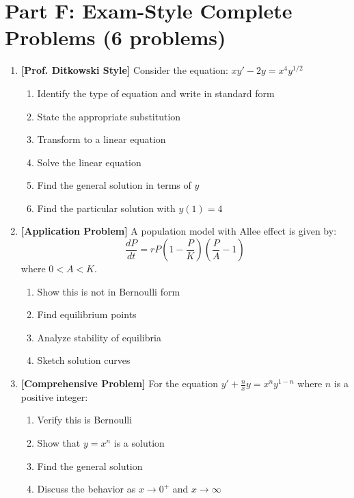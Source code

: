 \documentclass[12pt]{article}
\begin{document}
\section*{Part F: Exam-Style Complete Problems (6 problems)}

\begin{enumerate}[resume]
    \item \textbf{[Prof. Ditkowski Style]}
    Consider the equation: $xy' - 2y = x^4y^{1/2}$
    \begin{enumerate}
        \item Identify the type of equation and write in standard form
        \item State the appropriate substitution
        \item Transform to a linear equation
        \item Solve the linear equation
        \item Find the general solution in terms of $y$
        \item Find the particular solution with $y(1) = 4$
    \end{enumerate}

    \item \textbf{[Application Problem]}
    A population model with Allee effect is given by:
    $$\frac{dP}{dt} = rP\left(1 - \frac{P}{K}\right)\left(\frac{P}{A} - 1\right)$$
    where $0 < A < K$.
    \begin{enumerate}
        \item Show this is not in Bernoulli form
        \item Find equilibrium points
        \item Analyze stability of equilibria
        \item Sketch solution curves
    \end{enumerate}

    \item \textbf{[Comprehensive Problem]}
    For the equation $y' + \frac{n}{x}y = x^{n}y^{1-n}$ where $n$ is a positive integer:
    \begin{enumerate}
        \item Verify this is Bernoulli
        \item Show that $y = x^n$ is a solution
        \item Find the general solution
        \item Discuss the behavior as $x \to 0^+$ and $x \to \infty$
    \end{enumerate}


\end{enumerate}
\end{document}
